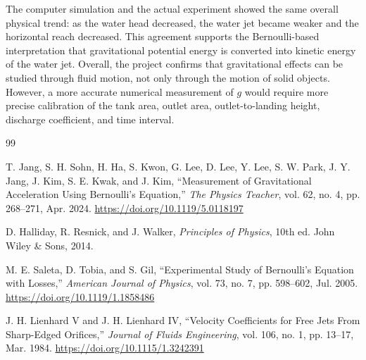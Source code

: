 \documentclass[11pt,letterpaper]{article}
\begin{document}
The computer simulation and the actual experiment showed the same overall physical trend: as the water head decreased, the water jet became weaker and the horizontal reach decreased. This agreement supports the Bernoulli-based interpretation that gravitational potential energy is converted into kinetic energy of the water jet. Overall, the project confirms that gravitational effects can be studied through fluid motion, not only through the motion of solid objects. However, a more accurate numerical measurement of $g$ would require more precise calibration of the tank area, outlet area, outlet-to-landing height, discharge coefficient, and time interval.

\begin{thebibliography}{99}

T. Jang, S. H. Sohn, H. Ha, S. Kwon, G. Lee, D. Lee, Y. Lee, S. W. Park, J. Y. Jang, J. Kim, S. E. Kwak, and J. Kim,
``Measurement of Gravitational Acceleration Using Bernoulli's Equation,''
\textit{The Physics Teacher}, vol. 62, no. 4, pp. 268--271, Apr. 2024. \url{https://doi.org/10.1119/5.0118197}

D. Halliday, R. Resnick, and J. Walker,
\textit{Principles of Physics},
10th ed. John Wiley \& Sons, 2014.

M. E. Saleta, D. Tobia, and S. Gil,
``Experimental Study of Bernoulli's Equation with Losses,''
\textit{American Journal of Physics}, vol. 73, no. 7, pp. 598--602, Jul. 2005. \url{https://doi.org/10.1119/1.1858486}

J. H. Lienhard V and J. H. Lienhard IV,
``Velocity Coefficients for Free Jets From Sharp-Edged Orifices,''
\textit{Journal of Fluids Engineering}, vol. 106, no. 1, pp. 13--17, Mar. 1984. \url{https://doi.org/10.1115/1.3242391}

\end{thebibliography}
\end{document}

